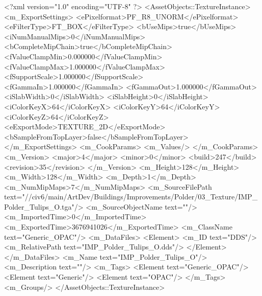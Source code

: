 <?xml version="1.0" encoding="UTF-8" ?>
<AssetObjects::TextureInstance>
	<m_ExportSettings>
		<ePixelformat>PF_R8_UNORM</ePixelformat>
		<eFilterType>FT_BOX</eFilterType>
		<bUseMips>true</bUseMips>
		<iNumManualMips>0</iNumManualMips>
		<bCompleteMipChain>true</bCompleteMipChain>
		<fValueClampMin>0.000000</fValueClampMin>
		<fValueClampMax>1.000000</fValueClampMax>
		<fSupportScale>1.000000</fSupportScale>
		<fGammaIn>1.000000</fGammaIn>
		<fGammaOut>1.000000</fGammaOut>
		<iSlabWidth>0</iSlabWidth>
		<iSlabHeight>0</iSlabHeight>
		<iColorKeyX>64</iColorKeyX>
		<iColorKeyY>64</iColorKeyY>
		<iColorKeyZ>64</iColorKeyZ>
		<eExportMode>TEXTURE_2D</eExportMode>
		<bSampleFromTopLayer>false</bSampleFromTopLayer>
	</m_ExportSettings>
	<m_CookParams>
		<m_Values/>
	</m_CookParams>
	<m_Version>
		<major>4</major>
		<minor>0</minor>
		<build>247</build>
		<revision>35</revision>
	</m_Version>
	<m_Height>128</m_Height>
	<m_Width>128</m_Width>
	<m_Depth>1</m_Depth>
	<m_NumMipMaps>7</m_NumMipMaps>
	<m_SourceFilePath text="//civ6/main/ArtDev/Buildings/Improvements/Polder/03_Texture/IMP_Polder_Tulips_O.tga"/>
	<m_SourceObjectName text=""/>
	<m_ImportedTime>0</m_ImportedTime>
	<m_ExportedTime>3676941026</m_ExportedTime>
	<m_ClassName text="Generic_OPAC"/>
	<m_DataFiles>
		<Element>
			<m_ID text="DDS"/>
			<m_RelativePath text="IMP_Polder_Tulips_O.dds"/>
		</Element>
	</m_DataFiles>
	<m_Name text="IMP_Polder_Tulips_O"/>
	<m_Description text=""/>
	<m_Tags>
		<Element text="Generic_OPAC"/>
		<Element text="Generic"/>
		<Element text="OPAC"/>
	</m_Tags>
	<m_Groups/>
</AssetObjects::TextureInstance>

 